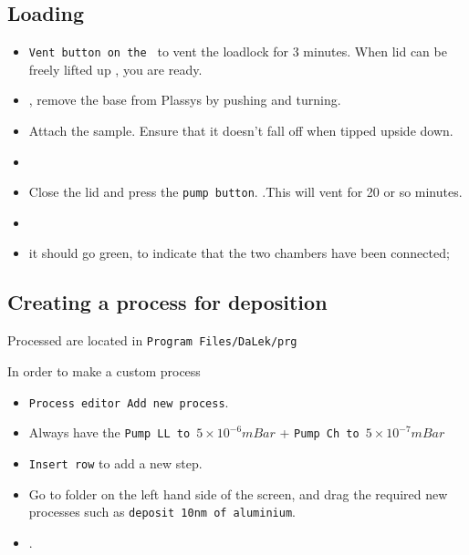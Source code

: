 \subsection{Loading}
\begin{itemize}
\item  \texttt{Vent button  on the  } to
  vent the loadlock for 3 minutes.   When lid can be freely lifted up
  , you are ready.
\item {},  remove the base from  Plassys by pushing
  and turning.
\item Attach the sample. Ensure that  it doesn't fall off when tipped
  upside down.
\item {}
\item Close  the lid and  press the \texttt{pump  button}. .This will vent for 20
  or so minutes.  
\item   {}
\item  {}  \ira it should go green, to
  indicate that the two chambers have been connected;
\end{itemize}

\subsection{Creating a process for deposition}
\begin{framed}\noindent
  Processed are located in \texttt{Program Files/DaLek/prg}
\end{framed}

  In order to make a custom process

  \begin{itemize}
  \item \texttt{Process editor \ira Add new process}.
  \item Always  have the  \texttt{Pump LL to  $5\times10^{-6}mBar$} +
    \texttt{Pump Ch to $5\times10^{-7}mBar$}
  \item \texttt{Insert row} to add a new step.
  \item Go to  folder on the left  hand side of the  screen, and drag
    the  required  new  processes  such as  \texttt{deposit  10nm  of
      aluminium}.
  \item {}.
  \end{itemize}

